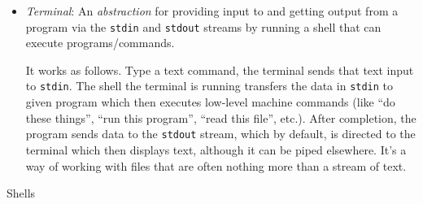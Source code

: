 \documentclass[12pt]{article}
\theoremstyle{plain}
\theoremstyle{definition}
\theoremstyle{remark}
\begin{document}
\begin{itemize}
  \item
    \emph{Terminal}:
    An \emph{abstraction} for providing input to and getting output from
    a program via the \texttt{stdin} and \texttt{stdout} streams by
    running a shell that can execute programs/commands.

    It works as follows.
    Type a text command, the terminal sends that text input to
    \texttt{stdin}.
    The shell the terminal is running transfers the data in
    \texttt{stdin} to given program which then executes low-level
    machine commands (like ``do these things'', ``run this program'',
    ``read this file'', etc.).
    After completion, the program sends data to the \texttt{stdout}
    stream, which by default, is directed to the terminal which then
    displays text, although it can be piped elsewhere.
    It's a way of working with files that are often nothing more than a
    stream of text.
\end{itemize}
Shells
\end{document}
